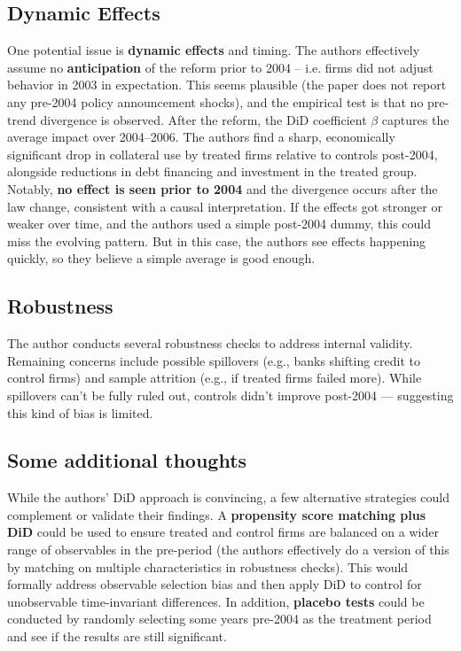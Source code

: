 \subsection{Dynamic Effects}
One potential issue is \textbf{dynamic effects} and timing. The authors effectively assume no \textbf{anticipation} of the reform prior to 2004 -- i.e. firms did not adjust behavior in 2003 in expectation. This seems plausible (the paper does not report any pre-2004 policy announcement shocks), and the empirical test is that no pre-trend divergence is observed. After the reform, the DiD coefficient $\beta$ captures the average impact over 2004--2006. The authors find a sharp, economically significant drop in collateral use by treated firms relative to controls post-2004, alongside reductions in debt financing and investment in the treated group. Notably, \textbf{no effect is seen prior to 2004} and the divergence occurs after the law change, consistent with a causal interpretation.  If the effects got stronger or weaker over time, and the authors used a simple post-2004 dummy, this could miss the evolving pattern. But in this case, the authors see effects happening quickly, so they believe a simple average is good enough.

\subsection{Robustness}
The author conducts several robustness checks to address internal validity.  Remaining concerns include possible spillovers (e.g., banks shifting credit to control firms) and sample attrition (e.g., if treated firms failed more). While spillovers can't be fully ruled out, controls didn't improve post-2004 — suggesting this kind of bias is limited. 

\subsection{Some additional thoughts}

While the authors' DiD approach is convincing, a few alternative strategies could complement or validate their findings. A \textbf{propensity score matching plus DiD} could be used to ensure treated and control firms are balanced on a wider range of observables in the pre-period (the authors effectively do a version of this by matching on multiple characteristics in robustness checks). This would formally address observable selection bias and then apply DiD to control for unobservable time-invariant differences. In addition, \textbf{placebo tests} could be conducted by randomly selecting some years pre-2004 as the treatment period and see if the results are still significant.

